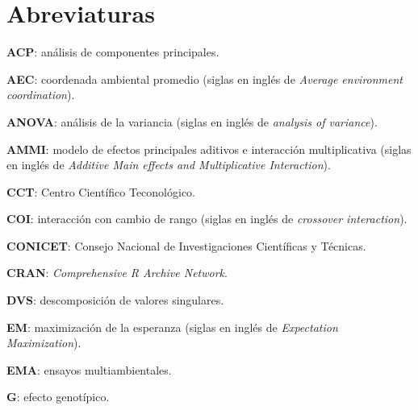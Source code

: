 

\chapter*{Abreviaturas}
\begin{spacing}{1}
\begin{description}
\item{\textbf{ACP}}: análisis de componentes principales.

\item{\textbf{AEC}}: coordenada ambiental promedio (siglas en inglés de \emph{Average environment coordination}).

\item{\textbf{ANOVA}}: análisis de la variancia (siglas en inglés de \emph{analysis of variance}).

\item{\textbf{AMMI}}: modelo de efectos principales aditivos e interacción multiplicativa (siglas en inglés de \emph{Additive Main effects and Multiplicative Interaction}).

\item{\textbf{CCT}}: Centro Científico Teconológico.

\item{\textbf{COI}}: interacción con cambio de rango (siglas en inglés de \emph{crossover interaction}).

\item{\textbf{CONICET}}: Consejo Nacional de Investigaciones Científicas y Técnicas.

\item{\textbf{CRAN}}: \emph{Comprehensive R Archive Network}.

\item{\textbf{DVS}}: descomposición de valores singulares.

\item{\textbf{EM}}: maximización de la esperanza (siglas en inglés de \emph{Expectation Maximization}).

\item{\textbf{EMA}}: ensayos multiambientales.

\item{\textbf{G}}: efecto genotípico.


\end{description}
\end{spacing}
